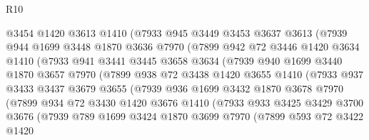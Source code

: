 \begin{lexlean}{R10}
\begin{coremodule}
              @3454
              @1420
              @3613
              @1410
              (@7933
                @945
                @3449
                @3453
                @3637
                @3613
                (@7939
                  @944
                  @1699
                  @3448
                  @1870
                  @3636
                  @7970
                  (@7899
                    @942
                    @72
                    @3446
                    @1420
                    @3634
                    @1410
                    (@7933
                      @941
                      @3441
                      @3445
                      @3658
                      @3634
                      (@7939
                        @940
                        @1699
                        @3440
                        @1870
                        @3657
                        @7970
                        (@7899
                          @938
                          @72
                          @3438
                          @1420
                          @3655
                          @1410
                          (@7933
                            @937
                            @3433
                            @3437
                            @3679
                            @3655
                            (@7939
                              @936
                              @1699
                              @3432
                              @1870
                              @3678
                              @7970
                              (@7899
                                @934
                                @72
                                @3430
                                @1420
                                @3676
                                @1410
                                (@7933
                                  @933
                                  @3425
                                  @3429
                                  @3700
                                  @3676
                                  (@7939
                                    @789
                                    @1699
                                    @3424
                                    @1870
                                    @3699
                                    @7970
                                    (@7899
                                      @593
                                      @72
                                      @3422
                                      @1420

\end{coremodule}
\end{lexlean}
